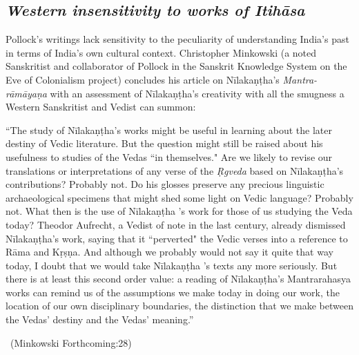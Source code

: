 \subsection*{\textit{Western insensitivity to works of Itihāsa}}

Pollock’s writings lack sensitivity to the peculiarity of understanding India’s past in terms of India’s own cultural context. Christopher Minkowski (a noted Sanskritist and collaborator of Pollock in the Sanskrit Knowledge System on the Eve of Colonialism project) concludes his article on Nīlakaṇṭha’s \textit{Mantra-rāmāyaṇa} with an assessment of Nīlakaṇṭha’s creativity with all the smugness a Western Sanskritist and Vedist can summon:

\begin{myquote}
“The study of Nīlakaṇṭha's works might be useful in learning about the later destiny of Vedic literature. But the question might still be raised about his usefulness to studies of the Vedas “in themselves." Are we likely to revise our translations or interpretations of any verse of the \textit{Ṛgveda} based on Nīlakaṇṭha's contributions? Probably not. Do his glosses preserve any precious linguistic archaeological specimens that might shed some light on Vedic language? Probably not. What then is the use of Nīlakaṇṭha 's work for those of us studying the Veda today? Theodor Aufrecht, a Vedist of note in the last century, already dismissed Nīlakaṇṭha's work, saying that it ``perverted" the Vedic verses into a reference to Rāma and Kṛṣṇa. And although we probably would not say it quite that way today, I doubt that we would take Nīlakaṇṭha 's texts any more seriously. But there is at least this second order value: a reading of Nīlakaṇṭha's Mantrarahasya works can remind us of the assumptions we make today in doing our work, the location of our own disciplinary boundaries, the distinction that we make between the Vedas' destiny and the Vedas' meaning.”

~\hfill (Minkowski Forthcoming:28)
\end{myquote}

